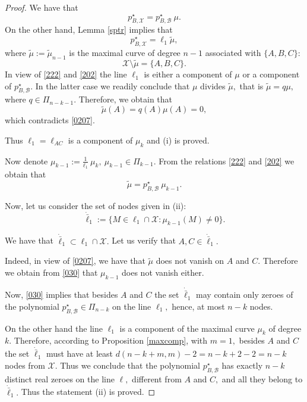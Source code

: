 \documentclass[a4paper,12pt]{article}
\theoremstyle{definition}
\numberwithin{equation}{section}
\numberwithin{figure}{section}
\newcommand{\Bset}{\mathcal{B}}
\newcommand{\Xset}{\mathcal{X}}
\begin{document}
\begin{proof}
We have that
\begin{equation}\label{222}p^\star_{B,\Xset}=p^\star_{B,\Bset}\ \mu.
\end{equation}
On the other hand, Lemma \ref{sptr} implies that
\begin{equation}\label{202}p^\star_{B,\Xset}=\ell_1 \tilde\mu,
\end{equation}
where $\tilde\mu:=\tilde\mu_{n-1}$ is the  maximal curve of degree $n-1$ associated with $\{A,B,C\}:$
\begin{equation}\label{0207}\Xset\setminus \tilde\mu=\{A,B,C\}.\end{equation}
In view of \eqref{222} and \eqref{202} the line $\ell_1$ is either a component of $\mu$  or a component of  $p^\star_{B,\Bset}.$ In the latter case we readily conclude that $\mu$ divides $\tilde\mu,$ that is $\tilde\mu=q\mu,$ where
$q\in\Pi_{n-k-1}.$ Therefore, we obtain that 
$$\tilde\mu(A)=q(A)\mu(A)=0,$$  
which contradicts \eqref{0207}.



Thus $\ell_1=\ell_{AC}$ is a component of $\mu_k$ and (i) is proved.

Now denote $\mu_{k-1}:=\frac{1}{\ell_1}\ \mu_k,\ \mu_{k-1}\in\Pi_{k-1}.$ From the relations \eqref{222} and \eqref{202} we obtain that 
\begin{equation}\label{030}\tilde\mu=p^\star_{B,\Bset}\ \mu_{k-1}.\end{equation}


Now, let us consider the set of nodes  given in (ii):
$$\dot{\bar{\ell}}_1:=\{M\in{\ell_1}\cap  \Xset: \mu_{k-1}(M)\neq 0\}.$$


We have that ${\dot{\bar{\ell}}}_1\subset \ell_1\cap\Xset.$ Let us verify that $A,C\in \dot{\bar{\ell}}_1.$ 

Indeed, in view of \eqref{0207}, we have that $\tilde\mu$ does not vanish on $A$ and $C.$ Therefore  we obtain from \eqref{030} that $\mu_{k-1}$ does not vanish either.

Now,  \eqref{030} implies that besides $A$ and $C$ the set $\dot{\bar{\ell}}_1$ may contain only zeroes of 
the polynomial $p^\star_{B,\Bset}\in\Pi_{n-k}$ on the line $\ell_1,$ hence, at most $n-k$ nodes.

On the other hand the line $\ell_1$ is a component of the maximal curve $\mu_k$ of degree $k.$ Therefore, according to Proposition \ref{maxcomp}, with $m=1,$ besides $A$ and $C$ the set $\dot{\bar{\ell}}_1$ must have at least $d(n-k+m,m)-2=n-k+2-2=n-k$ nodes from $\Xset.$ 
Thus we conclude that the polynomial $p^\star_{B,\Bset}$ has exactly $n-k$ distinct real zeroes on the line $\ell,$ different from $A$ and $C,$ and all they belong to $\dot{\bar{\ell}}_1.$ Thus the statement (ii) is proved.


\end{proof}
\end{document}
